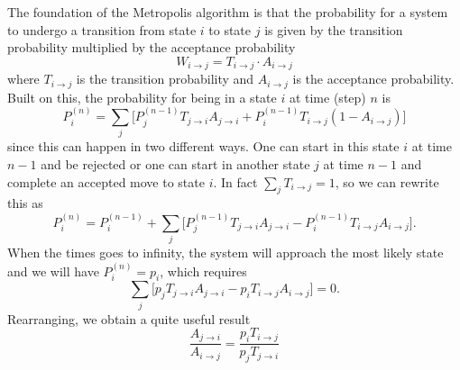 \documentclass[norsk,a4paper,12pt]{article}
\begin{document}
The foundation of the Metropolis algorithm is that the probability for a system to undergo a transition from state $i$ to state $j$ is given by the transition probability multiplied by the acceptance probability
\begin{equation}
W_{i\rightarrow j} = T_{i \rightarrow j}\cdot A_{i \rightarrow j}
\end{equation}
where $T_{i \rightarrow j}$ is the transition probability and $A_{i \rightarrow j}$ is the acceptance probability. Built on this, the probability for being in a state $i$ at time (step) $n$ is
\begin{equation}
P_i^{(n)} = \sum_j\bigg[P_j^{(n-1)}T_{j \rightarrow i}A_{j \rightarrow i} + P_i^{(n-1)}T_{i \rightarrow j}(1-A_{i \rightarrow j})\bigg]
\end{equation}
since this can happen in two different ways. One can start in this state $i$ at time $n-1$ and be rejected or one can start in another state $j$ at time $n-1$ and complete an accepted move to state $i$. In fact $\sum_j T_{i \rightarrow j} =1$, so we can rewrite this as 
\begin{equation}
P_i^{(n)} = P_i^{(n-1)} + \sum_j\bigg[P_j^{(n-1)}T_{j \rightarrow i}A_{j \rightarrow i} - P_i^{(n-1)}T_{i \rightarrow j}A_{i \rightarrow j}\bigg].
\end{equation}
When the times goes to infinity, the system will approach the most likely state and we will have $P_i^{(n)} = p_i$, which requires
\begin{equation}
\sum_j\bigg[p_jT_{j \rightarrow i}A_{j \rightarrow i} - p_iT_{i \rightarrow j}A_{i \rightarrow j}\bigg]=0.
\end{equation}
Rearranging, we obtain a quite useful result
\begin{equation}
\frac{A_{j\rightarrow i}}{A_{i\rightarrow j}}=\frac{p_iT_{i\rightarrow j}}{p_jT_{j\rightarrow i}}
\end{equation}
\end{document}

